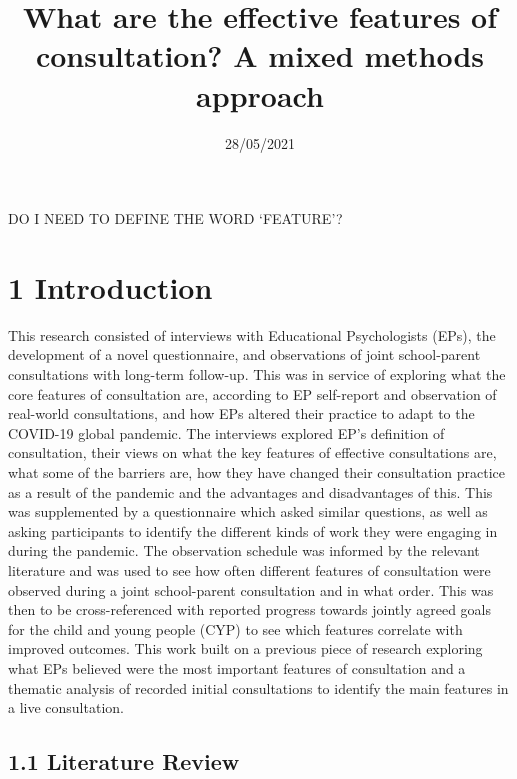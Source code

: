 \documentclass[
]{article}
\title{What are the effective features of consultation? A mixed methods
approach}
\author{}
\date{\vspace{-2.5em}28/05/2021}
\begin{document}
\maketitle

DO I NEED TO DEFINE THE WORD `FEATURE'?

\hypertarget{introduction}{%
\section{1 Introduction}\label{introduction}}

This research consisted of interviews with Educational Psychologists
(EPs), the development of a novel questionnaire, and observations of
joint school-parent consultations with long-term follow-up. This was in
service of exploring what the core features of consultation are,
according to EP self-report and observation of real-world consultations,
and how EPs altered their practice to adapt to the COVID-19 global
pandemic. The interviews explored EP's definition of consultation, their
views on what the key features of effective consultations are, what some
of the barriers are, how they have changed their consultation practice
as a result of the pandemic and the advantages and disadvantages of
this. This was supplemented by a questionnaire which asked similar
questions, as well as asking participants to identify the different
kinds of work they were engaging in during the pandemic. The observation
schedule was informed by the relevant literature and was used to see how
often different features of consultation were observed during a joint
school-parent consultation and in what order. This was then to be
cross-referenced with reported progress towards jointly agreed goals for
the child and young people (CYP) to see which features correlate with
improved outcomes. This work built on a previous piece of research
exploring what EPs believed were the most important features of
consultation and a thematic analysis of recorded initial consultations
to identify the main features in a live consultation.

\hypertarget{literature-review}{%
\subsection{1.1 Literature Review}\label{literature-review}}
\end{document}
